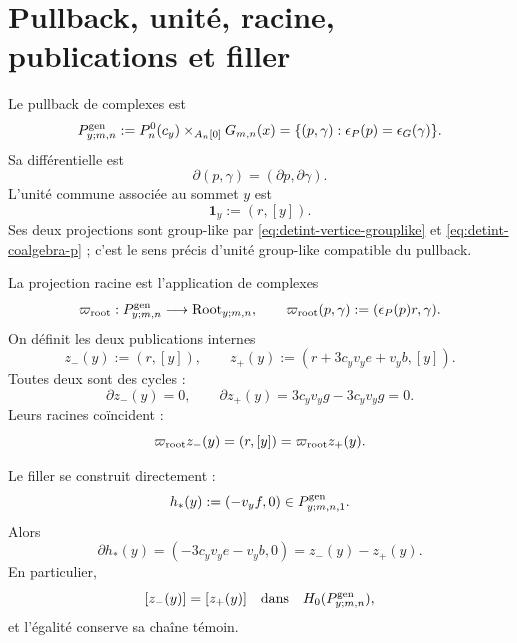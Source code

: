 \section{Pullback, unité, racine, publications et filler}

Le pullback de complexes est
\begin{equation}\label{eq:detint-pgen}
 P^{\rm gen}_{y;m,n}
 :=P_n^0(c_y)\times_{A_n[0]}G_{m,n}(x)
 =\{(p,\gamma):\epsilon_P(p)=\epsilon_G(\gamma)\}.
\end{equation}
Sa différentielle est
\begin{equation}\label{eq:detint-pgen-d}
 \partial(p,\gamma)=(\partial p,\partial\gamma).
\end{equation}
L'unité commune associée au sommet \(y\) est
\begin{equation}\label{eq:detint-unidad}
 \mathbf1_y:=(r,[y]).
\end{equation}
Ses deux projections sont group-like par
\eqref{eq:detint-vertice-grouplike} et
\eqref{eq:detint-coalgebra-p} ; c'est le sens précis d'unité
group-like compatible du pullback.

La projection racine est l'application de complexes
\begin{equation}\label{eq:detint-proyeccion-root}
 \varpi_{\rm root}:P^{\rm gen}_{y;m,n}\longrightarrow
 \operatorname{Root}_{y;m,n},
 \qquad
 \varpi_{\rm root}(p,\gamma):=(\epsilon_P(p)r,\gamma).
\end{equation}
On définit les deux publications internes
\begin{equation}\label{eq:detint-zpm}
 z_-(y):=(r,[y]),
 \qquad
 z_+(y):=(r+3c_yv_ye+v_yb,[y]).
\end{equation}
Toutes deux sont des cycles :
\begin{equation}\label{eq:detint-zpm-ciclos}
 \partial z_-(y)=0,
 \qquad
 \partial z_+(y)=3c_yv_yg-3c_yv_yg=0.
\end{equation}
Leurs racines coïncident :
\begin{equation}\label{eq:detint-raiz-comun}
 \varpi_{\rm root}z_-(y)
 =(r,[y])
 =\varpi_{\rm root}z_+(y).
\end{equation}

Le filler se construit directement :
\begin{equation}\label{eq:detint-hstar}
 h_*(y):=(-v_yf,0)\in P^{\rm gen}_{y;m,n,1}.
\end{equation}
Alors
\begin{equation}\label{eq:detint-filler-identidad}
 \partial h_*(y)
 =(-3c_yv_ye-v_yb,0)
 =z_-(y)-z_+(y).
\end{equation}
En particulier,
\begin{equation}\label{eq:detint-clases-iguales}
 [z_-(y)]=[z_+(y)]
 \quad\text{dans}\quad H_0(P^{\rm gen}_{y;m,n}),
\end{equation}
et l'égalité conserve sa chaîne témoin.

